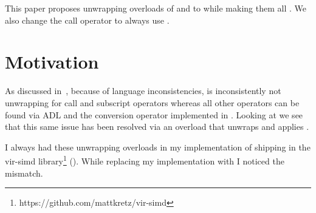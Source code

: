 \newcommand\wgTitle{\code{constant\_wrapper} should unwrap on call and subscript}
\newcommand\wgName{Matthias Kretz <m.kretz@gsi.de>\\
  Tomasz Kamiński <tomaszkam@gmail.com>}
\newcommand\wgDocumentNumber{P3978R3}
\newcommand\wgGroup{LWG}
\newcommand\wgTarget{\CC{}26}
\newcommand\wgAcknowledgements{Thanks to Barry Revzin for helpful feedback.}

\usepackage{mymacros}
\usepackage{wg21}
\setcounter{tocdepth}{2} %
\hypersetup{bookmarksdepth=5}
\usepackage{changelog}
\usepackage{underscore}
\usepackage{multirow}



\newcommand\wglink[1]{\href{https://wg21.link/#1}{#1}}

\renewcommand{\lst}[1]{Listing~\ref{#1}}
\renewcommand{\sect}[1]{Section~\ref{#1}}
\renewcommand{\ttref}[1]{Tony~Table~\ref{#1}}
\renewcommand{\tabref}[1]{Table~\ref{#1}}


\begin{wgTitlepage}
  This paper proposes unwrapping overloads of  and  to
   while making them all .
  We also change the call operator to always use .
\end{wgTitlepage}

\pagestyle{scrheadings}




\pagebreak

\section{Motivation}

As discussed in~\cite{P3948R0}, because of language inconsistencies, \std{}
is inconsistently not unwrapping for call and subscript operators whereas all other operators can
be found via ADL and the conversion operator implemented in .
Looking at \std{} we see that this same issue has been resolved via an
 overload that unwraps and applies .

I always had these unwrapping overloads in my implementation of  shipping in
the vir-simd library\footnote{https://github.com/mattkretz/vir-simd}
().
While replacing my implementation with \std{} I noticed the mismatch.

